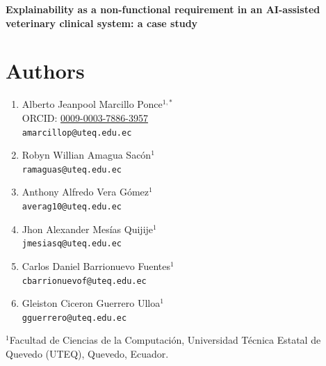 \documentclass[12pt]{article}
\begin{document}

\begin{center}
{\Large\bfseries
Explainability as a non-functional requirement in an AI-assisted
veterinary clinical system: a case study
}
\end{center}

\vspace{1em}


\section*{Authors}

\begin{enumerate}

  \item Alberto Jeanpool Marcillo Ponce$^{1,\ast}$\\
  ORCID: \href{https://orcid.org/0009-0003-7886-3957}
  {0009-0003-7886-3957}\\
  \texttt{amarcillop@uteq.edu.ec}

  \item Robyn Willian Amagua Sacón$^{1}$\\
  \texttt{ramaguas@uteq.edu.ec}

  \item Anthony Alfredo Vera Gómez$^{1}$\\
  \texttt{averag10@uteq.edu.ec}

  \item Jhon Alexander Mesías Quijije$^{1}$\\
  \texttt{jmesiasq@uteq.edu.ec}

  \item Carlos Daniel Barrionuevo Fuentes$^{1}$\\
  \texttt{cbarrionuevof@uteq.edu.ec}

  \item Gleiston Ciceron Guerrero Ulloa$^{1}$\\
  \texttt{gguerrero@uteq.edu.ec}

\end{enumerate}

\noindent
$^{1}$Facultad de Ciencias de la Computación,
Universidad Técnica Estatal de Quevedo (UTEQ),
Quevedo, Ecuador.
\end{document}
